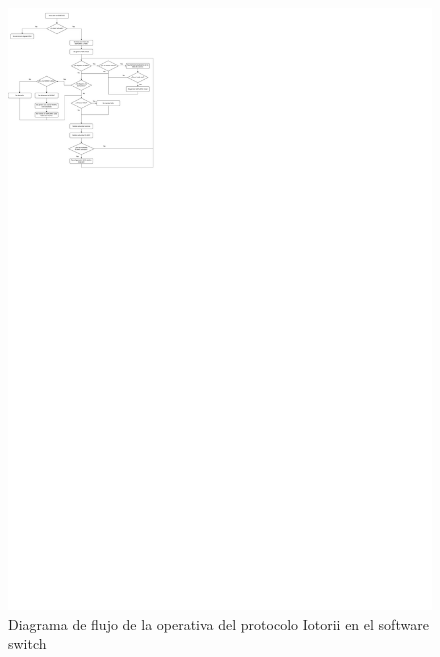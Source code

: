 \begin{figure}[ht!]
    \centering
    \includegraphics[width=\textwidth]{archivos/img/dev/iotorii.pdf}
    \caption{Diagrama de flujo de la operativa del protocolo Iotorii en el software switch }
    \label{fig:iotoriiFulls}
\end{figure}

\newpage

